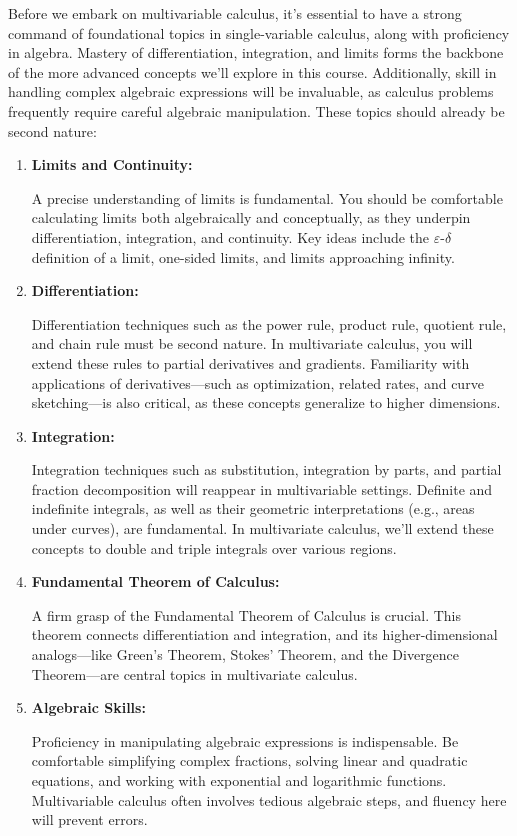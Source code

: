 \noindent Before we embark on multivariable calculus, it’s essential to have a strong command of foundational topics in single-variable calculus, along with proficiency in algebra. Mastery of differentiation, integration, and limits forms the backbone of the more advanced concepts we’ll explore in this course. Additionally, skill in handling complex algebraic expressions will be invaluable, as calculus problems frequently require careful algebraic manipulation. These topics should already be second nature:

\begin{enumerate}
    \item \textbf{Limits and Continuity:}
    
    \noindent A precise understanding of limits is fundamental. You should be comfortable calculating limits both algebraically and conceptually, as they underpin differentiation, integration, and continuity. Key ideas include the \(\varepsilon\)-\(\delta\) definition of a limit, one-sided limits, and limits approaching infinity.
    
    \item \textbf{Differentiation:}
    
    \noindent Differentiation techniques such as the power rule, product rule, quotient rule, and chain rule must be second nature. In multivariate calculus, you will extend these rules to partial derivatives and gradients. Familiarity with applications of derivatives—such as optimization, related rates, and curve sketching—is also critical, as these concepts generalize to higher dimensions.

    \item \textbf{Integration:}
    
    \noindent Integration techniques such as substitution, integration by parts, and partial fraction decomposition will reappear in multivariable settings. Definite and indefinite integrals, as well as their geometric interpretations (e.g., areas under curves), are fundamental. In multivariate calculus, we’ll extend these concepts to double and triple integrals over various regions.

    \item \textbf{Fundamental Theorem of Calculus:}
    
    \noindent A firm grasp of the Fundamental Theorem of Calculus is crucial. This theorem connects differentiation and integration, and its higher-dimensional analogs—like Green’s Theorem, Stokes’ Theorem, and the Divergence Theorem—are central topics in multivariate calculus.

    \item \textbf{Algebraic Skills:}
    
    \noindent Proficiency in manipulating algebraic expressions is indispensable. Be comfortable simplifying complex fractions, solving linear and quadratic equations, and working with exponential and logarithmic functions. Multivariable calculus often involves tedious algebraic steps, and fluency here will prevent errors.
\end{enumerate}

